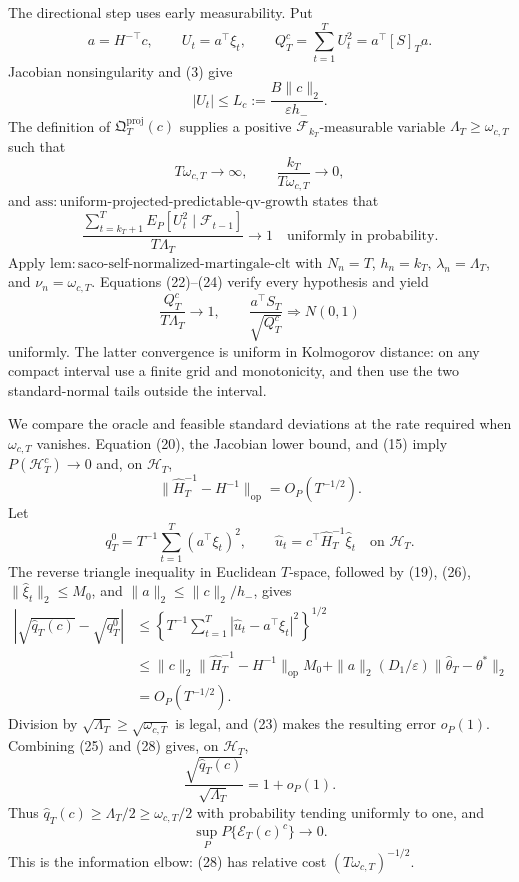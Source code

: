 The directional step uses early measurability.  Put
\[
 a=H^{-\top}c,\qquad U_t=a^\top\xi_t,\qquad
 Q_T^c=\sum_{t=1}^TU_t^2=a^\top[S]_Ta.
\tag{21}
\]
Jacobian nonsingularity and (3) give
\[
 |U_t|\le L_c:=\frac{B\|c\|_2}{\varepsilon h_-}.
\tag{22}
\]
The definition of \(\mathfrak Q_T^{\mathrm{proj}}(c)\) supplies a positive
\(\mathcal F_{k_T}\)-measurable variable
\(\Lambda_T\ge\omega_{c,T}\) such that
\[
 T\omega_{c,T}\longrightarrow\infty,
 \qquad \frac{k_T}{T\omega_{c,T}}\longrightarrow0,
\tag{23}
\]
and \(\mathrm{ass:uniform\text{-}projected\text{-}predictable\text{-}qv\text{-}growth}\)
states that
\[
 \frac{\sum_{t=k_T+1}^TE_P[U_t^2\mid\mathcal F_{t-1}]}
 {T\Lambda_T}\longrightarrow1
 \quad\text{uniformly in probability}.
\tag{24}
\]
Apply \(\mathrm{lem:saco\text{-}self\text{-}normalized\text{-}martingale\text{-}clt}\)
with \(N_n=T\), \(h_n=k_T\), \(\lambda_n=\Lambda_T\), and
\(\nu_n=\omega_{c,T}\).  Equations (22)--(24) verify every hypothesis and
yield
\[
 \frac{Q_T^c}{T\Lambda_T}\longrightarrow1,
 \qquad \frac{a^\top S_T}{\sqrt{Q_T^c}}\Rightarrow N(0,1)
\tag{25}
\]
uniformly.  The latter convergence is uniform in Kolmogorov distance:
on any compact interval use a finite grid and monotonicity, and then use
the two standard-normal tails outside the interval.

We compare the oracle and feasible standard deviations at the rate required
when \(\omega_{c,T}\) vanishes.  Equation (20), the Jacobian lower bound,
and (15) imply \(P(\mathcal H_T^c)\to0\) and, on \(\mathcal H_T\),
\[
 \|\widehat H_T^{-1}-H^{-1}\|_{\mathrm{op}}=O_P(T^{-1/2}).
\tag{26}
\]
Let
\[
 q_T^0=T^{-1}\sum_{t=1}^T(a^\top\xi_t)^2,
 \qquad \widehat u_t=c^\top\widehat H_T^{-1}\widehat\xi_t
 \quad\text{on }\mathcal H_T.
\tag{27}
\]
The reverse triangle inequality in Euclidean \(T\)-space, followed by
(19), (26), \(\|\widehat\xi_t\|_2\le M_0\), and
\(\|a\|_2\le\|c\|_2/h_-\), gives
\[
 \begin{aligned}
 \left|\sqrt{\widehat q_T(c)}-\sqrt{q_T^0}\right|
 &\le\left\{T^{-1}\sum_{t=1}^T
 |\widehat u_t-a^\top\xi_t|^2\right\}^{1/2}\\
 &\le \|c\|_2\|\widehat H_T^{-1}-H^{-1}\|_{\mathrm{op}}M_0
 +\|a\|_2(D_1/\varepsilon)\|\widehat\theta_T-\theta^*\|_2\\
 &=O_P(T^{-1/2}).
 \end{aligned}
\tag{28}
\]
Division by \(\sqrt{\Lambda_T}\ge\sqrt{\omega_{c,T}}\) is legal, and
(23) makes the resulting error \(o_P(1)\).  Combining (25) and (28) gives,
on \(\mathcal H_T\),
\[
 \frac{\sqrt{\widehat q_T(c)}}{\sqrt{\Lambda_T}}=1+o_P(1).
\tag{29}
\]
Thus \(\widehat q_T(c)\ge\Lambda_T/2\ge\omega_{c,T}/2\) with probability
tending uniformly to one, and
\[
 \sup_P P\{\mathcal E_T(c)^c\}\longrightarrow0.
\tag{30}
\]
This is the information elbow: (28) has relative cost
\((T\omega_{c,T})^{-1/2}\).

